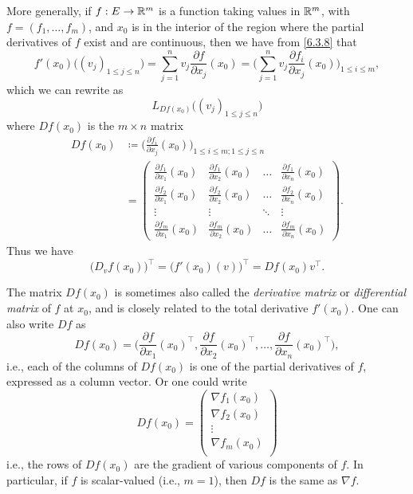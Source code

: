 \begin{ac}\label{ac:6.3.4}
  More generally, if \(f : E \to \mathbb{R}^m\) is a function taking values in \(\mathbb{R}^m\), with \(f = (f_1, \dots, f_m)\), and \(x_0\) is in the interior of the region where the partial derivatives of \(f\) exist and are continuous, then we have from \cref{6.3.8} that
  \[
    f'(x_0)\big((v_j)_{1 \leq j \leq n}\big) = \sum_{j = 1}^n v_j \frac{\partial f}{\partial x_j}(x_0) = \bigg(\sum_{j = 1}^n v_j \frac{\partial f_i}{\partial x_j}(x_0)\bigg)_{1 \leq i \leq m},
  \]
  which we can rewrite as
  \[
    L_{D f(x_0)}\big((v_j)_{1 \leq j \leq n}\big)
  \]
  where \(D f(x_0)\) is the \(m \times n\) matrix
  \begin{align*}
    D f(x_0) & \coloneqq \bigg(\frac{\partial f_i}{\partial x_j}(x_0)\bigg)_{1 \leq i \leq m ; 1 \leq j \leq n}                                    \\
             & = \begin{pmatrix}
                   \frac{\partial f_1}{\partial x_1}(x_0) & \frac{\partial f_1}{\partial x_2}(x_0) & \dots  & \frac{\partial f_1}{\partial x_n}(x_0) \\
                   \frac{\partial f_2}{\partial x_1}(x_0) & \frac{\partial f_2}{\partial x_2}(x_0) & \dots  & \frac{\partial f_2}{\partial x_n}(x_0) \\
                   \vdots                                 & \vdots                                 & \ddots & \vdots                                 \\
                   \frac{\partial f_m}{\partial x_1}(x_0) & \frac{\partial f_m}{\partial x_2}(x_0) & \dots  & \frac{\partial f_m}{\partial x_n}(x_0)
                 \end{pmatrix}.
  \end{align*}
  Thus we have
  \[
    \big(D_v f(x_0)\big)^\top = \big(f'(x_0)(v)\big)^\top = D f(x_0) v^\top.
  \]

  The matrix \(D f(x_0)\) is sometimes also called the \emph{derivative matrix} or \emph{differential matrix} of \(f\) at \(x_0\), and is closely related to the total derivative \(f'(x_0)\).
  One can also write \(Df\) as
  \[
    D f(x_0) = \bigg(\frac{\partial f}{\partial x_1}(x_0)^\top, \frac{\partial f}{\partial x_2}(x_0)^\top, \dots, \frac{\partial f}{\partial x_n}(x_0)^\top\bigg),
  \]
  i.e., each of the columns of \(D f(x_0)\) is one of the partial derivatives of \(f\), expressed as a column vector.
  Or one could write
  \[
    D f(x_0) = \begin{pmatrix}
      \nabla f_1(x_0) \\
      \nabla f_2(x_0) \\
      \vdots          \\
      \nabla f_m(x_0) \\
    \end{pmatrix}
  \]
  i.e., the rows of \(D f(x_0)\) are the gradient of various components of \(f\).
  In particular, if \(f\) is scalar-valued (i.e., \(m = 1\)), then \(Df\) is the same as \(\nabla f\).
\end{ac}

